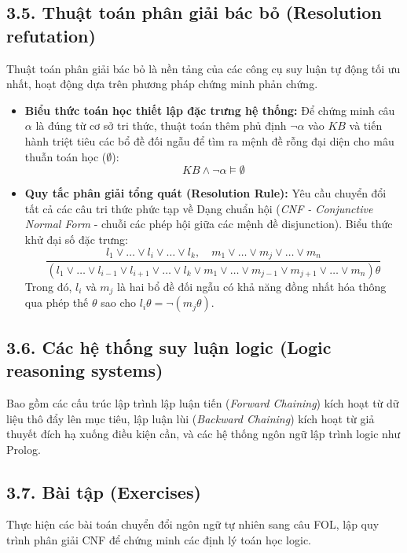\documentclass[../main.tex]{subfiles}
\begin{document}
\subsection{3.5. Thuật toán phân giải bác bỏ (Resolution refutation)}
Thuật toán phân giải bác bỏ là nền tảng của các công cụ suy luận tự động tối ưu nhất, hoạt động dựa trên phương pháp chứng minh phản chứng.
\begin{itemize}
    \item \textbf{Biểu thức toán học thiết lập đặc trưng hệ thống:} Để chứng minh câu $\alpha$ là đúng từ cơ sở tri thức, thuật toán thêm phủ định $\neg\alpha$ vào $KB$ và tiến hành triệt tiêu các bổ đề đối ngẫu để tìm ra mệnh đề rỗng đại diện cho mâu thuẫn toán học ($\emptyset$):
    \begin{equation}
        KB \wedge \neg\alpha \models \emptyset
    \end{equation}
    \item \textbf{Quy tắc phân giải tổng quát (Resolution Rule):} Yêu cầu chuyển đổi tất cả các câu tri thức phức tạp về Dạng chuẩn hội (\textit{CNF - Conjunctive Normal Form} - chuỗi các phép hội giữa các mệnh đề disjunction). Biểu thức khử đại số đặc trưng:
    \begin{equation}
        \frac{l_1 \vee \dots \vee l_i \vee \dots \vee l_k, \quad m_1 \vee \dots \vee m_j \vee \dots \vee m_n}{(l_1 \vee \dots \vee l_{i-1} \vee l_{i+1} \vee \dots \vee l_k \vee m_1 \vee \dots \vee m_{j-1} \vee m_{j+1} \vee \dots \vee m_n)\theta}
    \end{equation}
    Trong đó, $l_i$ và $m_j$ là hai bổ đề đối ngẫu có khả năng đồng nhất hóa thông qua phép thế $\theta$ sao cho $l_i\theta = \neg (m_j\theta)$.
\end{itemize}

\subsection{3.6. Các hệ thống suy luận logic (Logic reasoning systems)}
Bao gồm các cấu trúc lập trình lập luận tiến (\textit{Forward Chaining}) kích hoạt từ dữ liệu thô đẩy lên mục tiêu, lập luận lùi (\textit{Backward Chaining}) kích hoạt từ giả thuyết đích hạ xuống điều kiện cần, và các hệ thống ngôn ngữ lập trình logic như Prolog.

\subsection{3.7. Bài tập (Exercises)}
Thực hiện các bài toán chuyển đổi ngôn ngữ tự nhiên sang câu FOL, lập quy trình phân giải CNF để chứng minh các định lý toán học logic.
\end{document}

